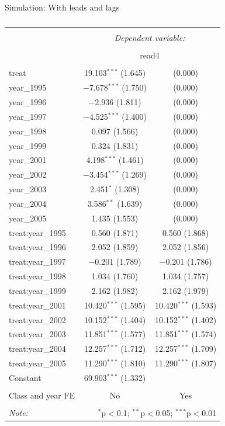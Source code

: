 \documentclass[
  ignorenonframetext,
]{beamer}
\begin{document}
\begin{frame}[fragile]{Simulation: With leads and lags}
\begin{table}[!htbp] \centering 
  \caption{} 
  \label{} 
\begin{tabular}{@{\extracolsep{5pt}}lcc} 
\\[-1.8ex]\hline 
\hline \\[-1.8ex] 
 & \multicolumn{2}{c}{\textit{Dependent variable:}} \\ 
\cline{2-3} 
\\[-1.8ex] & \multicolumn{2}{c}{read4} \\ 
\hline \\[-1.8ex] 
 treat & 19.103$^{***}$ (1.645) &  (0.000) \\ 
  year\_1995 & $-$7.678$^{***}$ (1.750) &  (0.000) \\ 
  year\_1996 & $-$2.936 (1.811) &  (0.000) \\ 
  year\_1997 & $-$4.525$^{***}$ (1.400) &  (0.000) \\ 
  year\_1998 & 0.097 (1.566) &  (0.000) \\ 
  year\_1999 & 0.324 (1.831) &  (0.000) \\ 
  year\_2001 & 4.198$^{***}$ (1.461) &  (0.000) \\ 
  year\_2002 & $-$3.454$^{***}$ (1.269) &  (0.000) \\ 
  year\_2003 & 2.451$^{*}$ (1.308) &  (0.000) \\ 
  year\_2004 & 3.586$^{**}$ (1.639) &  (0.000) \\ 
  year\_2005 & 1.435 (1.553) &  (0.000) \\ 
  treat:year\_1995 & 0.560 (1.871) & 0.560 (1.868) \\ 
  treat:year\_1996 & 2.052 (1.859) & 2.052 (1.856) \\ 
  treat:year\_1997 & $-$0.201 (1.789) & $-$0.201 (1.786) \\ 
  treat:year\_1998 & 1.034 (1.760) & 1.034 (1.757) \\ 
  treat:year\_1999 & 2.162 (1.982) & 2.162 (1.979) \\ 
  treat:year\_2001 & 10.420$^{***}$ (1.595) & 10.420$^{***}$ (1.593) \\ 
  treat:year\_2002 & 10.152$^{***}$ (1.404) & 10.152$^{***}$ (1.402) \\ 
  treat:year\_2003 & 11.851$^{***}$ (1.577) & 11.851$^{***}$ (1.574) \\ 
  treat:year\_2004 & 12.257$^{***}$ (1.712) & 12.257$^{***}$ (1.709) \\ 
  treat:year\_2005 & 11.290$^{***}$ (1.810) & 11.290$^{***}$ (1.807) \\ 
  Constant & 69.903$^{***}$ (1.332) &  \\ 
 \hline \\[-1.8ex] 
Class and year FE & No & Yes \\ 
\hline 
\hline \\[-1.8ex] 
\textit{Note:}  & \multicolumn{2}{r}{$^{*}$p$<$0.1; $^{**}$p$<$0.05; $^{***}$p$<$0.01} \\ 
\end{tabular} 
\end{table}
\end{frame}
\end{document}
